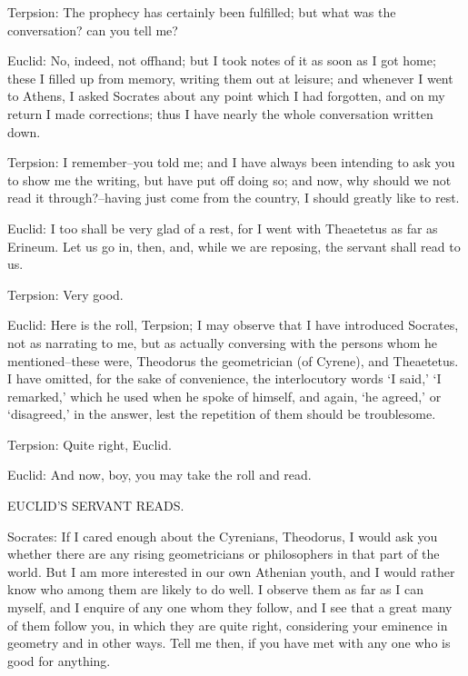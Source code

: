 Terpsion: The prophecy has certainly been fulfilled; but what was the
conversation? can you tell me?

Euclid: No, indeed, not offhand; but I took notes of it as soon as I got
home; these I filled up from memory, writing them out at leisure; and
whenever I went to Athens, I asked Socrates about any point which I had
forgotten, and on my return I made corrections; thus I have nearly the
whole conversation written down.

Terpsion: I remember--you told me; and I have always been intending to
ask you to show me the writing, but have put off doing so; and now, why
should we not read it through?--having just come from the country, I
should greatly like to rest.

Euclid: I too shall be very glad of a rest, for I went with Theaetetus
as far as Erineum. Let us go in, then, and, while we are reposing, the
servant shall read to us.

Terpsion: Very good.

Euclid: Here is the roll, Terpsion; I may observe that I have introduced
Socrates, not as narrating to me, but as actually conversing with the
persons whom he mentioned--these were, Theodorus the geometrician (of
Cyrene), and Theaetetus. I have omitted, for the sake of convenience,
the interlocutory words `I said,' `I remarked,' which he used when he
spoke of himself, and again, `he agreed,' or `disagreed,' in the answer,
lest the repetition of them should be troublesome.

Terpsion: Quite right, Euclid.

Euclid: And now, boy, you may take the roll and read.

EUCLID'S SERVANT READS.

Socrates: If I cared enough about the Cyrenians, Theodorus, I would ask
you whether there are any rising geometricians or philosophers in that
part of the world. But I am more interested in our own Athenian youth,
and I would rather know who among them are likely to do well. I observe
them as far as I can myself, and I enquire of any one whom they follow,
and I see that a great many of them follow you, in which they are quite
right, considering your eminence in geometry and in other ways. Tell me
then, if you have met with any one who is good for anything.

